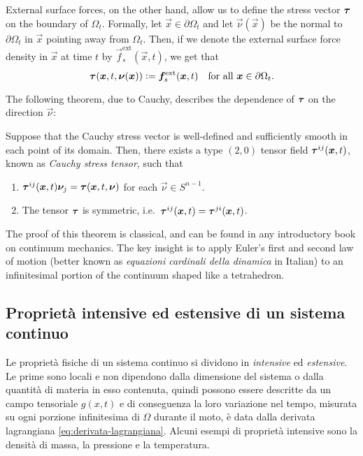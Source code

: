 External surface forces, on the other hand, allow us to define
the stress vector $\bm{\tau}$ on the boundary of $\Omega_t$.
Formally, let $\vec{x} \in \partial \Omega_t$ and let $\vec{\nu}(\vec{x})$
be the normal to $\partial \Omega_t$ in $\vec{x}$ pointing away from $\Omega_t$.
Then, if we denote the external surface force density in $\vec{x}$ at
time $t$ by $\vec{f}_s^{\text{ext}}(\vec{x},t)$, we get that
\begin{equation} \label{eq:sforzo-sul-bordo}
\bm{\tau}(\bm{x},t,\bm{\nu}(\bm{x}))
\vcentcolon= \bm{f}_s^{\text{ext}}(\bm{x},t)
\quad \text{for all $\bm{x} \in \partial \Omega_t$}.
\end{equation}

\noindent The following theorem, due to Cauchy, describes the dependence
of $\bm{\tau}$ on the direction $\vec{\nu}$:
\begin{teor}
Suppose that the Cauchy stress vector is well-defined and sufficiently
smooth in each point of its domain. Then, there exists a type $(2,0)$
tensor field $\bm{\tau}^{ij}(\bm{x},t)$,
known as \emph{Cauchy stress tensor}, such that
\begin{enumerate}
\item $\bm{\tau}^{ij}(\bm{x},t) \bm{\nu}_j = \bm{\tau}(\bm{x},t,\bm{\nu})$
	for each $\vec{\nu} \in S^{n-1}$.
\item The tensor $\bm{\tau}$ is symmetric,
	i.e.\ $\bm{\tau}^{ij}(\bm{x},t) = \bm{\tau}^{ji}(\bm{x},t)$.
\end{enumerate}
\end{teor}

\noindent The proof of this theorem is classical, and can be found
in any introductory book on continuum mechanics.
The key insight is to apply Euler's first and second law of motion
(better known as \emph{equazioni cardinali della dinamica} in Italian)
to an infinitesimal portion of the continuum shaped like a tetrahedron.

\subsection*{Proprietà intensive ed estensive di un sistema continuo}

Le proprietà fisiche di un sistema continuo si dividono in \emph{intensive}
ed \emph{estensive}. Le prime sono locali e non dipendono dalla dimensione
del sistema o dalla quantità di materia in esso contenuta, quindi
possono essere descritte da un campo tensoriale $g(x,t)$
e di conseguenza la loro variazione nel tempo,
misurata su ogni porzione infinitesima di $\Omega$ durante il moto,
è data dalla derivata lagrangiana \eqref{eq:derivata-lagrangiana}.
Alcuni esempi di proprietà intensive sono la densità di massa,
la pressione e la temperatura.

